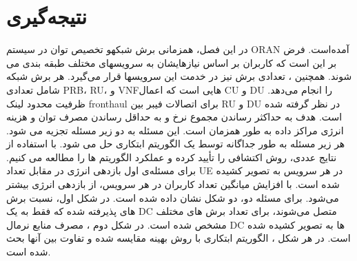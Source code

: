 \section{نتیجه‌گیری}
در این فصل، همزمانی برش شبکهو تخصیص توان در سیستم ORAN آمده‌است. فرض بر این است که کاربران بر اساس نیازهایشان به سرویسهای مختلف طبقه بندی می شوند. همچنین ، تعدادی برش نیز در خدمت این سرویسها قرار می‌گیرد. هر برش شبکه شامل تعدادی PRB، RU، و VNFهایی است که اعمال CU و DU را انجام می‌دهد. ظرفیت محدود لینک fronthaul برای اتصالات فیبر بین RU و DU در نظر گرفته شده است.
هدف به حداکثر رساندن مجموع نرخ و به حداقل رساندن مصرف توان و هزینه انرژی مراکز داده به طور همزمان است.
این مسئله به دو زیر مسئله تجزیه می شود. هر زیر مسئله به طور جداگانه توسط یک الگوریتم ابتکاری حل می شود. با استفاده از نتایج عددی، روش اکتشافی را تأیید کرده و عملکرد الگوریتم ها را مطالعه می کنیم.
برای مسئله‌ی اول بازدهی انرژی در مقابل تعداد UE در هر سرویس به تصویر کشیده شده است.
با افزایش میانگین تعداد کاربران در هر سرویس، از بازدهی انرژی بیشتر می‌شود.
برای مسئله دو، دو شکل نشان داده شده است.
در شکل اول، نسبت برش های پذیرفته شده که فقط به یک DC متصل می‌شوند، برای تعداد برش های مختلف مشخص شده است.
در شکل دوم ، مصرف منابع نرمال DC ها به تصویر کشیده شده است.
در هر شکل ، الگوریتم ابتکاری با روش بهینه مقایسه شده و تفاوت بین آنها بحث شده است.

